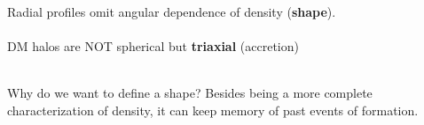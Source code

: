 \documentclass[xcolor=dvipsnames]{beamer}
\begin{document}
\begin{frame}
Radial profiles omit angular dependence of density (\textbf{shape}).\\~\\

DM halos are NOT spherical but \textbf{triaxial} \cite{Allgood2006} (accretion)\\~\\

\begin{block}
{Why do we want to define a shape?}
Besides being a more complete characterization of density, it can keep memory of past events of formation.
\end{block}

\end{frame}
\end{document}

